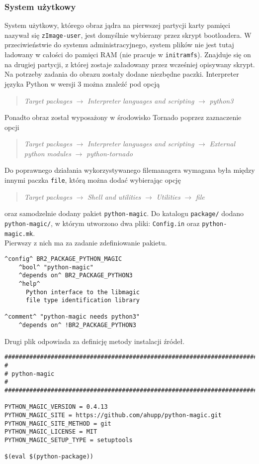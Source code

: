 \documentclass[10pt,a4paper]{article}
\begin{document}
\subsubsection{System użytkowy}
System użytkowy, którego obraz jądra na pierwszej partycji karty pamięci nazywał się \texttt{zImage-user}, jest domyślnie wybierany przez skrypt bootloadera. W przeciwieństwie do systemu administracyjnego, system plików nie jest tutaj ładowany w całości do pamięci RAM (nie pracuje w \texttt{initramfs}). Znajduje się on na drugiej partycji, z której zostaje załadowany przez wcześniej opisywany skrypt.\\[\baselineskip]
Na potrzeby zadania do obrazu zostały dodane niezbędne paczki. Interpreter języka Python w wersji 3 można znaleźć pod opcją
\begin{quote}
	\textit{Target packages} $\rightarrow$ \textit{Interpreter languages and scripting} $\rightarrow$ \textit{python3}
\end{quote}
Ponadto obraz został wyposażony w środowisko Tornado poprzez zaznaczenie opcji
\begin{quote}
	\textit{Target packages} $\rightarrow$ \textit{Interpreter languages and scripting} $\rightarrow$ \textit{External python modules} $\rightarrow$ \textit{python-tornado}
\end{quote}
Do poprawnego działania wykorzystywanego filemanagera wymagana była między innymi paczka \texttt{file}, którą można dodać wybierając opcję
\begin{quote}
	\textit{Target packages} $\rightarrow$ \textit{Shell and utilities} $\rightarrow$ \textit{Utilities} $\rightarrow$ \textit{file}
\end{quote}
oraz samodzelnie dodany pakiet \texttt{python-magic}. Do katalogu \texttt{package/} dodano \texttt{python-magic/}, w którym utworzono dwa pliki: \texttt{Config.in} oraz \texttt{python-magic.mk}.\\[\baselineskip]
Pierwszy z nich ma za zadanie zdefiniowanie pakietu.
\begin{lstlisting}[style=bash, caption={Zawartość pliku Config.in}, keywordstyle=\color{black}]
^config^ BR2_PACKAGE_PYTHON_MAGIC
	^bool^ "python-magic"
	^depends on^ BR2_PACKAGE_PYTHON3
	^help^
	  Python interface to the libmagic
	  file type identification library

^comment^ "python-magic needs python3"
	^depends on^ !BR2_PACKAGE_PYTHON3
\end{lstlisting}
Drugi plik odpowiada za definicję metody instalacji źródeł.
\begin{lstlisting}[style=bash, caption={Zawartość pliku python-magic.mk}, keywordstyle=\color{black}]
################################################################################
#
# python-magic
#
################################################################################

PYTHON_MAGIC_VERSION = 0.4.13
PYTHON_MAGIC_SITE = https://github.com/ahupp/python-magic.git
PYTHON_MAGIC_SITE_METHOD = git
PYTHON_MAGIC_LICENSE = MIT
PYTHON_MAGIC_SETUP_TYPE = setuptools

$(eval $(python-package))
\end{lstlisting}
\end{document}

